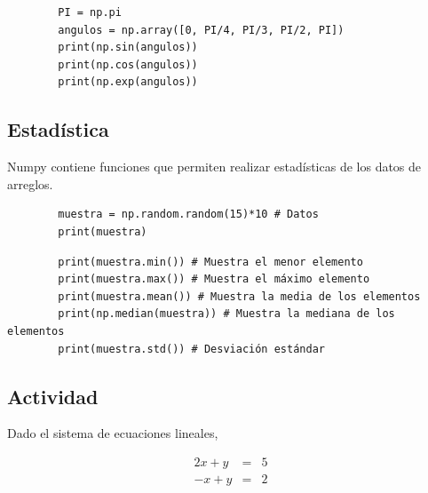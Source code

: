 \begin{listing}[H]
    \begin{verbatim}
        PI = np.pi
        angulos = np.array([0, PI/4, PI/3, PI/2, PI])
        print(np.sin(angulos))
        print(np.cos(angulos))
        print(np.exp(angulos))
    \end{verbatim}
\end{listing}

\subsection{Estadística}

Numpy contiene funciones que permiten realizar estadísticas de los datos
de arreglos.

\begin{listing}[H]
    \begin{verbatim}
        muestra = np.random.random(15)*10 # Datos
        print(muestra)
    \end{verbatim}
\end{listing}

\begin{listing}[H]
    \begin{verbatim}
        print(muestra.min()) # Muestra el menor elemento
        print(muestra.max()) # Muestra el máximo elemento
        print(muestra.mean()) # Muestra la media de los elementos
        print(np.median(muestra)) # Muestra la mediana de los elementos
        print(muestra.std()) # Desviación estándar
    \end{verbatim}
\end{listing}

\subsection{Actividad}

Dado el sistema de ecuaciones lineales,

\begin{eqnarray*}
  2x + y & = & 5 \\
  -x + y & = & 2
\end{eqnarray*}


